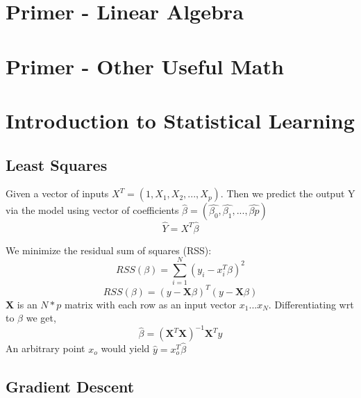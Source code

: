 \documentclass[12pt]{article}
\begin{document}
\newpage


\section{Primer - Linear Algebra}


\newpage


\section{Primer - Other Useful Math}

\newpage

\section{Introduction to Statistical Learning}
\subsection{Least Squares}
Given a vector of inputs $X^T = (1,X_{1}, X_{2},...,X_{p})$. Then we predict the output Y via the model using vector of coefficients $\hat{\beta} = (\hat{\beta_0}, \hat{\beta_1},...,\hat{\beta{p}})$
\begin{equation}
    \hat{Y} = X^{T}\hat{\beta}
\end{equation}

We minimize the residual sum of squares (RSS):
\begin{equation}
    RSS(\beta) = \sum_{i =1}^{N}(y_{i} - x_{i}^{T}\beta)^{2}
\end{equation}
\begin{equation}
    RSS(\beta) = (y - \textbf{X}\beta)^{T}(y - \textbf{X}\beta)    
\end{equation}
\textbf{X} is an $N * p$ matrix with each row as an input vector $x_{1}...x_{N}$. Differentiating wrt to $\beta$ we get, 
\begin{equation}
    \hat{\beta} = (\textbf{X}^{T}\textbf{X})^{-1}\textbf{X}^{T}y
\end{equation}
An arbitrary point $x_{o}$ would yield $\hat{y} = x_{o}^{T}\hat{\beta}$

\subsection{Gradient Descent}
\end{document}
